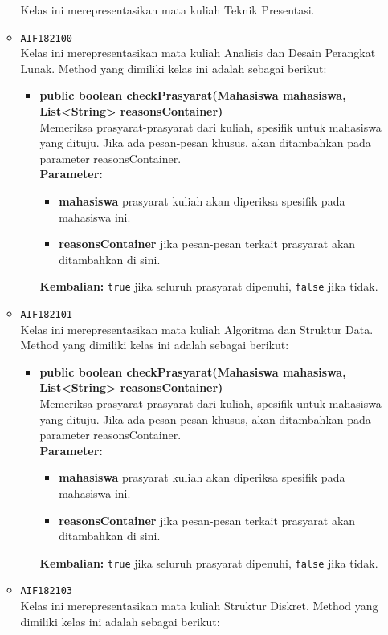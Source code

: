 \begin{enumerate}
\begin{itemize}
Kelas ini merepresentasikan mata kuliah Teknik Presentasi.
\item \texttt{AIF182100} \\
Kelas ini merepresentasikan mata kuliah Analisis dan Desain Perangkat Lunak. Method yang dimiliki kelas ini adalah sebagai berikut: 
\begin{itemize}
\item \textbf{public boolean checkPrasyarat(Mahasiswa mahasiswa, List<String> reasonsContainer)}\\
Memeriksa prasyarat-prasyarat dari kuliah, spesifik untuk mahasiswa yang dituju. Jika ada pesan-pesan khusus, akan ditambahkan pada parameter reasonsContainer.\\
\textbf{Parameter:}
\begin{itemize}
\item \textbf{mahasiswa} prasyarat kuliah akan diperiksa spesifik pada mahasiswa ini.
\item \textbf{reasonsContainer} jika pesan-pesan terkait prasyarat akan ditambahkan di sini.
\end{itemize}
\textbf{Kembalian:} \texttt{true} jika seluruh prasyarat dipenuhi, \texttt{false} jika tidak.
\end{itemize}
\item \texttt{AIF182101} \\
Kelas ini merepresentasikan mata kuliah Algoritma dan Struktur Data. Method yang dimiliki kelas ini adalah sebagai berikut: 
\begin{itemize}
\item \textbf{public boolean checkPrasyarat(Mahasiswa mahasiswa, List<String> reasonsContainer)}\\
Memeriksa prasyarat-prasyarat dari kuliah, spesifik untuk mahasiswa yang dituju. Jika ada pesan-pesan khusus, akan ditambahkan pada parameter reasonsContainer.\\
\textbf{Parameter:}
\begin{itemize}
\item \textbf{mahasiswa} prasyarat kuliah akan diperiksa spesifik pada mahasiswa ini.
\item \textbf{reasonsContainer} jika pesan-pesan terkait prasyarat akan ditambahkan di sini.
\end{itemize}
\textbf{Kembalian:} \texttt{true} jika seluruh prasyarat dipenuhi, \texttt{false} jika tidak.
\end{itemize}
\item \texttt{AIF182103} \\
Kelas ini merepresentasikan mata kuliah Struktur Diskret. Method yang dimiliki kelas ini adalah sebagai berikut: 

\end{itemize}
\end{enumerate}
